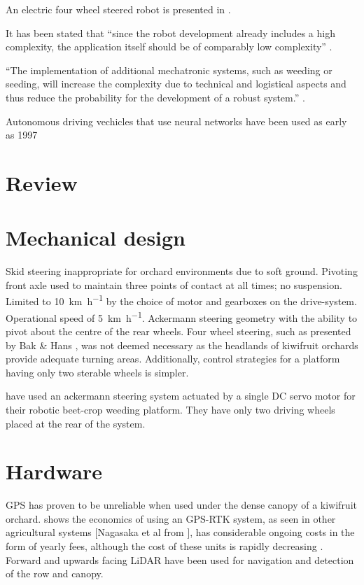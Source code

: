 \documentclass[preprint,authoryear,12pt]{elsarticle}
\begin{document}
An electric four wheel steered robot is presented in \cite{Bak2004}.

It has been stated that ``since the robot development already includes a high complexity, the application itself should be of comparably low complexity'' \citep{Ruckelshausen2009}.

``The implementation of additional mechatronic systems, such as weeding or seeding, will increase the complexity due to technical and logistical aspects and thus reduce the probability for the development of a robust system.'' \citep{Ruckelshausen2009}.

Autonomous driving vechicles that use neural networks have been used as early as 1997

\section{Review}

\section{Mechanical design}
\label{sect:mechanical}
Skid steering inappropriate for orchard environments due to soft ground.
Pivoting front axle used to maintain three points of contact at all times; no suspension.
Limited to \SI{10}{\kilo\meter\per\hour} by the choice of motor and gearboxes on the drive-system.
Operational speed of \SI{5}{\kilo\meter\per\hour}.
Ackermann steering geometry with the ability to pivot about the centre of the rear wheels.
Four wheel steering, such as presented by Bak \& Hans \citep{Bak2004}, was not deemed necessary as the headlands of kiwifruit orchards provide adequate turning areas.
Additionally, control strategies for a platform having only two sterable wheels is simpler.



\citep{Astrand2002} have used an ackermann steering system actuated by a single DC servo motor for their robotic beet-crop weeding platform. They have only two driving wheels placed at the rear of the system.


\section{Hardware}
\label{sect:hardware}
GPS has proven to be unreliable when used under the dense canopy of a kiwifruit orchard.
\citep{Pedersen2006} shows the economics of using an GPS-RTK system, as seen in other agricultural systems \citep{Bak2004,Ruckelshausen2009}[Nagasaka et al from \citep{Torii2000}], has considerable ongoing costs in the form of yearly fees, although the cost of these units is rapidly decreasing \citep{Torii2000}.
Forward and upwards facing LiDAR have been used for navigation and detection of the row and canopy.
\end{document}
